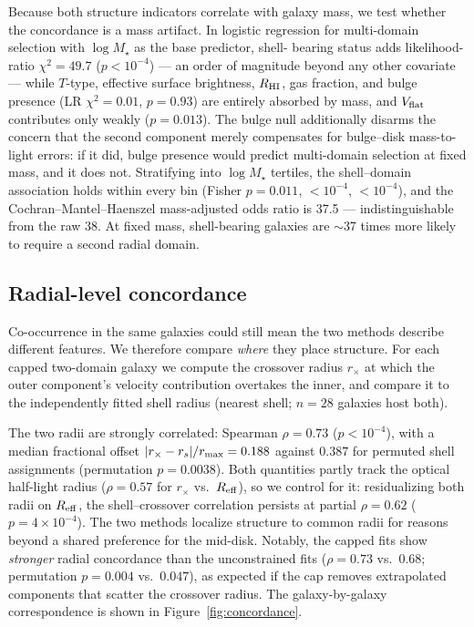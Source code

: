 \documentclass[twocolumn]{aastex701}
\newcommand{\vflat}{V_{\rm flat}}
\newcommand{\reff}{R_{\rm eff}}
\begin{document}
Because both structure indicators correlate with galaxy mass, we test
whether the concordance is a mass artifact. In logistic regression for
multi-domain selection with $\log M_\star$ as the base predictor, shell-%
bearing status adds likelihood-ratio $\chi^2 = 49.7$ ($p < 10^{-4}$) ---
an order of magnitude beyond any other covariate --- while $T$-type,
effective surface brightness, $R_{\rm HI}$, gas fraction, and bulge presence
(LR $\chi^2 = 0.01$, $p = 0.93$) are entirely absorbed by mass, and
$\vflat$ contributes only weakly ($p = 0.013$). The bulge null additionally
disarms the concern that the second component merely compensates for
bulge--disk mass-to-light errors: if it did, bulge presence would predict
multi-domain selection at fixed mass, and it does not. Stratifying into $\log M_\star$ tertiles, the shell--domain
association holds within every bin (Fisher $p = 0.011$, $<10^{-4}$,
$<10^{-4}$), and the Cochran--Mantel--Haenszel mass-adjusted odds ratio is
37.5 --- indistinguishable from the raw 38. At fixed mass, shell-bearing
galaxies are $\sim$37 times more likely to require a second radial domain.

\subsection{Radial-level concordance} \label{sec:radial}

Co-occurrence in the same galaxies could still mean the two methods describe
different features. We therefore compare \emph{where} they place structure.
For each capped two-domain galaxy we compute the crossover radius
$r_\times$ at which the outer component's velocity contribution overtakes the
inner, and compare it to the independently fitted shell radius (nearest
shell; $n = 28$ galaxies host both).

The two radii are strongly correlated: Spearman $\rho = 0.73$
($p < 10^{-4}$), with a median fractional offset
$|r_\times - r_s|/r_{\rm max} = 0.188$ against $0.387$ for permuted shell
assignments (permutation $p = 0.0038$). Both quantities partly track the
optical half-light radius ($\rho = 0.57$ for $r_\times$ vs.\ $\reff$), so we
control for it: residualizing both radii on $\reff$, the shell--crossover
correlation persists at partial $\rho = 0.62$ ($p = 4 \times 10^{-4}$). The
two methods localize structure to common radii for reasons beyond a shared
preference for the mid-disk. Notably, the capped fits show \emph{stronger}
radial concordance than the unconstrained fits ($\rho = 0.73$ vs.\ $0.68$;
permutation $p = 0.004$ vs.\ $0.047$), as expected if the cap removes
extrapolated components that scatter the crossover radius. The galaxy-by-galaxy
correspondence is shown in Figure~\ref{fig:concordance}.
\end{document}
